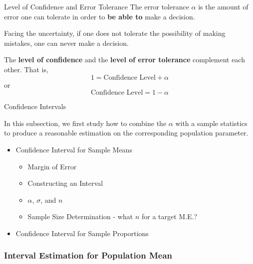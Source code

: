 \documentclass{beamer}
\begin{document}
\begin{frame}{Level of Confidence and Error Tolerance}
The error tolerance $\alpha$ is the amount of error one can tolerate in order to \textbf{be able to} make a decision.

\vspace{0.3 cm}
Facing the uncertainty, if one does not tolerate the possibility of making mistakes, one can never make a decision.

\vspace{0.3 cm}
The \textbf{level of confidence} and the \textbf{level of error tolerance} complement each other. That is, 
$$ 1 = \text{Confidence Level} + \alpha $$
or 
$$ \text{Confidence Level} = 1 - \alpha $$

\end{frame}

\begin{frame}{Confidence Intervals}
	
	In this subsection, we first study how to combine the $\alpha$ with a sample statistics to produce a reasonable estimation on the corresponding population parameter. 
	\vspace{0.3 cm}
	\begin{itemize}
		\item Confidence Interval for Sample Means
		\begin{itemize}
			\item Margin of Error
			\item Constructing an Interval
			\item $\alpha$, $\sigma$, and $n$
			\item Sample Size Determination - what $n$ for a target M.E.?
		\end{itemize}
		\item Confidence Interval for Sample Proportions
	\end{itemize}
	
\end{frame}




\subsubsection{Interval Estimation for Population Mean}
\end{document}
